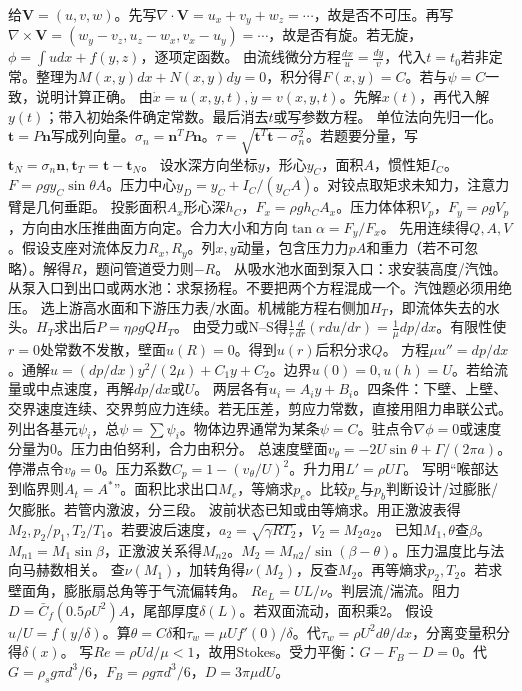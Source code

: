 给$\bm V=(u,v,w)$。先写$\nabla\cdot\bm V=u_x+v_y+w_z=\cdots$，故是否不可压。再写$\nabla\times\bm V=(w_y-v_z,u_z-w_x,v_x-u_y)=\cdots$，故是否有旋。若无旋，$\phi=\int u dx+f(y,z)$，逐项定函数。
由流线微分方程$\frac{dx}{u}=\frac{dy}{v}$，代入$t=t_0$若非定常。整理为$M(x,y)dx+N(x,y)dy=0$，积分得$F(x,y)=C$。若与$\psi=C$一致，说明计算正确。
由$\dot x=u(x,y,t),\dot y=v(x,y,t)$。先解$x(t)$，再代入解$y(t)$；带入初始条件确定常数。最后消去$t$或写参数方程。
单位法向先归一化。$\bm t=P\bm n$写成列向量。$\sigma_n=\bm n^T P\bm n$。$\tau=\sqrt{\bm t^T\bm t-\sigma_n^2}$。若题要分量，写$\bm t_N=\sigma_n\bm n,\bm t_T=\bm t-\bm t_N$。
设水深方向坐标$y$，形心$y_C$，面积$A$，惯性矩$I_C$。$F=\rho g y_C\sin\theta A$。压力中心$y_D=y_C+I_C/(y_CA)$。对铰点取矩求未知力，注意力臂是几何垂距。
投影面积$A_x$形心深$h_C$，$F_x=\rho gh_CA_x$。压力体体积$V_p$，$F_y=\rho gV_p$，方向由水压推曲面方向定。合力大小和方向$\tan\alpha=F_y/F_x$。
先用连续得$Q,A,V$。假设支座对流体反力$R_x,R_y$。列$x,y$动量，包含压力力$pA$和重力（若不可忽略）。解得$R$，题问管道受力则$-R$。
从吸水池水面到泵入口：求安装高度/汽蚀。从泵入口到出口或两水池：求泵扬程。不要把两个方程混成一个。汽蚀题必须用绝压。
选上游高水面和下游压力表/水面。机械能方程右侧加$H_T$，即流体失去的水头。$H_T$求出后$P=\eta\rho gQH_T$。
由受力或N--S得$\frac1r\frac{d}{dr}(rdu/dr)=\frac1\mu dp/dx$。有限性使$r=0$处常数不发散，壁面$u(R)=0$。得到$u(r)$后积分求$Q$。
方程$\mu u''=dp/dx$。通解$u=(dp/dx)y^2/(2\mu)+C_1y+C_2$。边界$u(0)=0,u(h)=U$。若给流量或中点速度，再解$dp/dx$或$U$。
两层各有$u_i=A_iy+B_i$。四条件：下壁、上壁、交界速度连续、交界剪应力连续。若无压差，剪应力常数，直接用阻力串联公式。
列出各基元$\psi_i$，总$\psi=\sum\psi_i$。物体边界通常为某条$\psi=C$。驻点令$\nabla\phi=0$或速度分量为0。压力由伯努利，合力由积分。
总速度壁面$v_\theta=-2U\sin\theta+\Gamma/(2\pi a)$。停滞点令$v_\theta=0$。压力系数$C_p=1-(v_\theta/U)^2$。升力用$L'=\rho U\Gamma$。
写明“喉部达到临界则$A_t=A^*$”。面积比求出口$M_e$，等熵求$p_e$。比较$p_e$与$p_b$判断设计/过膨胀/欠膨胀。若管内激波，分三段。
波前状态已知或由等熵求。用正激波表得$M_2,p_2/p_1,T_2/T_1$。若要波后速度，$a_2=\sqrt{\gamma RT_2}$，$V_2=M_2a_2$。
已知$M_1,\theta$查$\beta$。$M_{n1}=M_1\sin\beta$，正激波关系得$M_{n2}$。$M_2=M_{n2}/\sin(\beta-\theta)$。压力温度比与法向马赫数相关。
查$\nu(M_1)$，加转角得$\nu(M_2)$，反查$M_2$。再等熵求$p_2,T_2$。若求壁面角，膨胀扇总角等于气流偏转角。
$Re_L=UL/\nu$。判层流/湍流。阻力$D=\bar C_f(0.5\rho U^2)A$，尾部厚度$\delta(L)$。若双面流动，面积乘2。
假设$u/U=f(y/\delta)$。算$\theta=C\delta$和$\tau_w=\mu U f'(0)/\delta$。代$\tau_w=\rho U^2 d\theta/dx$，分离变量积分得$\delta(x)$。
写$Re=\rho Ud/\mu<1$，故用Stokes。受力平衡：$G-F_B-D=0$。代$G=\rho_sg\pi d^3/6$，$F_B=\rho g\pi d^3/6$，$D=3\pi\mu dU$。

